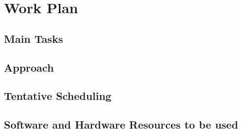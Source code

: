 \chapter{Work Plan}\label{chap:workPlan}

\section{Main Tasks}

\section{Approach}

\section{Tentative Scheduling}

\section{Software and Hardware Resources to be used}
